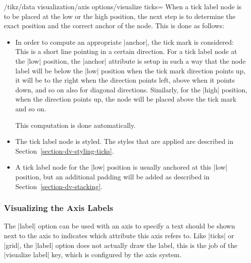 \begin{key}{/tikz/data visualization/axis options/visualize ticks=}
    When a tick label node is to be placed at the low or the high position, the
    next step is to determine the exact position and the correct anchor of the
    node. This is done as follows:
    \begin{itemize}
        \item In order to compute an appropriate |anchor|, the tick mark is
            considered: This is a short line pointing in a certain direction.
            For a tick label node at the |low| position, the |anchor| attribute
            is setup in such a way that the node label will be below the |low|
            position when the tick mark direction points up, it will be to the
            right when the direction points left, above when it points down,
            and so on also for diagonal directions. Similarly, for the |high|
            position, when the direction points up, the node will be placed
            above the tick mark and so on.

            This computation is done automatically.
        \item The tick label node is styled. The styles that are applied are
            described in Section~\ref{section-dv-styling-ticks}.
        \item A tick label node for the |low| position is usually anchored at
            this |low| position, but an additional padding will be added as
            described in Section~\ref{section-dv-stacking}.
    \end{itemize}
\end{key}


\subsubsection{Visualizing the Axis Labels}
\label{section-dv-visualize-label}

The |label| option can be used with an axis to specify a text should be shown
next to the axis to indicates which attribute this axis refers to. Like |ticks|
or |grid|, the |label| option does not actually draw the label, this is the job
of the |visualize label| key, which is configured by the axis system.

